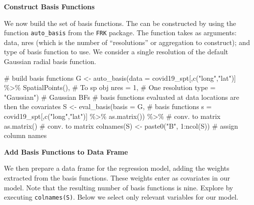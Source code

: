 \documentclass[
  letterpaper,
  krantz2]{style/krantz}
\newenvironment{Shaded}{\begin{snugshade}}{\end{snugshade}}
\newcommand{\AttributeTok}[1]{\textcolor[rgb]{0.40,0.45,0.13}{#1}}
\newcommand{\CommentTok}[1]{\textcolor[rgb]{0.37,0.37,0.37}{#1}}
\newcommand{\DecValTok}[1]{\textcolor[rgb]{0.68,0.00,0.00}{#1}}
\newcommand{\FunctionTok}[1]{\textcolor[rgb]{0.28,0.35,0.67}{#1}}
\newcommand{\NormalTok}[1]{\textcolor[rgb]{0.00,0.23,0.31}{#1}}
\newcommand{\OtherTok}[1]{\textcolor[rgb]{0.00,0.23,0.31}{#1}}
\newcommand{\SpecialCharTok}[1]{\textcolor[rgb]{0.37,0.37,0.37}{#1}}
\newcommand{\StringTok}[1]{\textcolor[rgb]{0.13,0.47,0.30}{#1}}
\begin{document}
\textbf{Construct Basis Functions}

We now build the set of basis functions. The can be constructed by using
the function \texttt{auto\_basis} from the \texttt{FRK} package. The
function takes as arguments: data, nres (which is the number of
``resolutions'' or aggregation to construct); and type of basis function
to use. We consider a single resolution of the default Gaussian radial
basis function.

\begin{Shaded}
\begin{Highlighting}[]
\CommentTok{\# build basis functions}
\NormalTok{G }\OtherTok{\textless{}{-}} \FunctionTok{auto\_basis}\NormalTok{(}\AttributeTok{data =}\NormalTok{ covid19\_spt[,}\FunctionTok{c}\NormalTok{(}\StringTok{"long"}\NormalTok{,}\StringTok{"lat"}\NormalTok{)] }\SpecialCharTok{\%\textgreater{}\%}
                       \FunctionTok{SpatialPoints}\NormalTok{(),           }\CommentTok{\# To sp obj}
                \AttributeTok{nres =} \DecValTok{1}\NormalTok{,                         }\CommentTok{\# One resolution}
                \AttributeTok{type =} \StringTok{"Gaussian"}\NormalTok{)                }\CommentTok{\# Gaussian BFs}
\CommentTok{\# basis functions evaluated at data locations are then the covariates}
\NormalTok{S }\OtherTok{\textless{}{-}} \FunctionTok{eval\_basis}\NormalTok{(}\AttributeTok{basis =}\NormalTok{ G,                       }\CommentTok{\# basis functions}
                \AttributeTok{s =}\NormalTok{ covid19\_spt[,}\FunctionTok{c}\NormalTok{(}\StringTok{"long"}\NormalTok{,}\StringTok{"lat"}\NormalTok{)] }\SpecialCharTok{\%\textgreater{}\%}
                     \FunctionTok{as.matrix}\NormalTok{()) }\SpecialCharTok{\%\textgreater{}\%}            \CommentTok{\# conv. to matrix}
     \FunctionTok{as.matrix}\NormalTok{()                                 }\CommentTok{\# conv. to matrix}
\FunctionTok{colnames}\NormalTok{(S) }\OtherTok{\textless{}{-}} \FunctionTok{paste0}\NormalTok{(}\StringTok{"B"}\NormalTok{, }\DecValTok{1}\SpecialCharTok{:}\FunctionTok{ncol}\NormalTok{(S)) }\CommentTok{\# assign column names}
\end{Highlighting}
\end{Shaded}

\textbf{Add Basis Functions to Data Frame}

We then prepare a data frame for the regression model, adding the
weights extracted from the basis functions. These weights enter as
covariates in our model. Note that the resulting number of basis
functions is nine. Explore by executing \texttt{colnames(S)}. Below we
select only relevant variables for our model.
\end{document}
